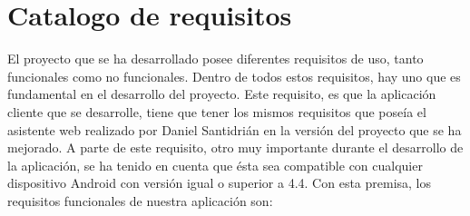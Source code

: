 \section{Catalogo de requisitos}

El proyecto que se ha desarrollado posee diferentes requisitos de uso, tanto funcionales como no funcionales. Dentro de todos estos requisitos, hay uno que es fundamental en el desarrollo del proyecto. Este requisito, es que la aplicación cliente que se desarrolle, tiene que tener los mismos requisitos que poseía el asistente web realizado por Daniel Santidrián en la versión del proyecto que se ha mejorado. \newline A parte de este requisito, otro muy importante durante el desarrollo de la aplicación, se ha tenido en cuenta que ésta sea compatible con cualquier dispositivo Android con versión igual o superior a 4.4. \newline Con esta premisa, los requisitos funcionales de nuestra aplicación son:

